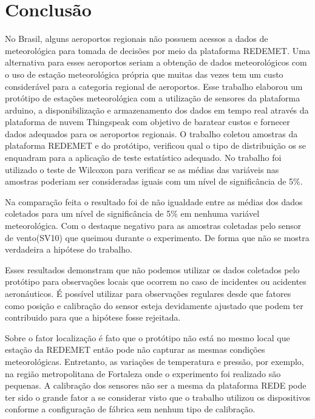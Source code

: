 \chapter{Conclusão} \label{conclusao} 

No Brasil, alguns aeroportos regionais não possuem acessos a dados de meteorológica para tomada de decisões por meio da plataforma REDEMET. Uma alternativa para esses aeroportos seriam a obtenção de dados meteorológicos com o uso de estação meteorológica própria que muitas das vezes tem um custo considerável para a categoria regional de aeroportos. Esse trabalho elaborou um protótipo de estações meteorológica com a utilização de sensores da plataforma arduino, a disponibilização e armazenamento dos dados em tempo real através da plataforma de nuvem Thingspeak com objetivo de baratear custos e fornecer dados adequados para os aeroportos regionais. O trabalho coletou amostras da plataforma REDEMET e do protótipo, verificou qual o tipo de distribuição os se enquadram para a aplicação de teste estatístico adequado. No trabalho foi utilizado o teste de Wilcoxon para verificar se as médias das variáveis nas amostras poderiam ser consideradas iguais com um nível de significância de 5\%.

Na comparação feita o resultado foi de não igualdade entre as médias dos dados coletados para um nível de significância de 5\% em nenhuma variável meteorológica. Com o destaque negativo para as amostras coletadas pelo sensor de vento(SV10) que queimou durante o experimento. De forma que não se mostra verdadeira a hipótese do trabalho.

Esses resultados demonstram que não podemos utilizar os dados coletados pelo protótipo para observações locais que ocorrem no caso de incidentes ou acidentes aeronáuticos. É possível utilizar para observações regulares desde que fatores como posição e calibração do sensor esteja devidamente ajustado que podem ter contribuido para que a hipótese fosse rejeitada.

Sobre o fator localização é fato que o protótipo não está no mesmo local que estação da REDEMET então pode não capturar as mesmas condições meteorológicas. Entretanto, as variações de temperatura e pressão, por exemplo, na região metropolitana de Fortaleza onde o experimento foi realizado são pequenas. A calibração dos sensores não ser a mesma da plataforma REDE pode ter sido o grande fator a se considerar visto que o trabalho utilizou os dispositivos conforme a configuração de fábrica sem nenhum tipo de calibração.


